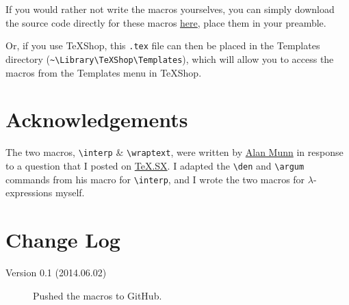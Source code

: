 \documentclass{article}
\newcommand{\interp}[2][]{
	\(
		\left\llbracket\,\text{#2}\,\right\rrbracket^{#1}
	\)
	}
\newcommand{\wraptext}[2][1in]{\begin{varwidth}{#1}{\RaggedRight#2}\end{varwidth}}
\newcommand{\den}[1]{
	\(
		\left[\,\text{#1}\,\right]
	\)
	}
\newcommand{\argum}[1]{
	\(
		\left(\,\text{#1}\,\right)
	\)
	}
\begin{document}
If you would rather not write the macros yourselves, you can simply download the source code directly for these macros \href{http://adamliter.org/content/LaTeX/macros/SemMacros/Template-SemMacros.tex}{here}, place them in your preamble.

Or, if you use TeXShop, this \texttt{.tex} file can then be placed in the Templates directory (\verb|~\Library\TeXShop\Templates|), which will allow you to access the macros from the Templates menu in TeXShop.

\section{\label{sec:acknowledgements}Acknowledgements}

The two macros, \verb|\interp| \& \verb|\wraptext|, were written by \href{http://tex.stackexchange.com/users/2693/alan-munn}{Alan Munn} in response to a question that I posted on \href{http://tex.stackexchange.com/questions/121605/macro-for-typesetting-semantic-denotations-linguistics}{TeX.SX}. I adapted the \verb|\den| and \verb|\argum| commands from his macro for \verb|\interp|, and I wrote the two macros for $\lambda$-expressions myself.

\section{\label{sec:changes}Change Log}

\begin{description}

\item[Version 0.1 (2014.06.02)]{Pushed the macros to GitHub.}

\end{description}


\end{document}
